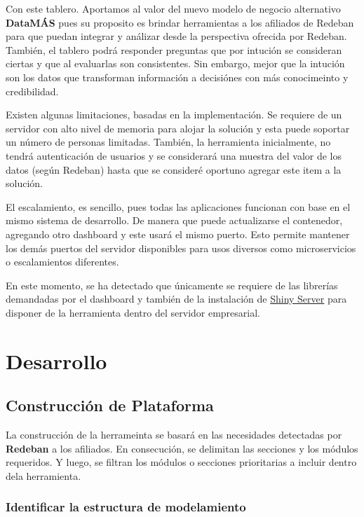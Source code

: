 \documentclass[a4paper]{article}
\begin{document}
Con este tablero. Aportamos al valor del nuevo modelo de negocio alternativo \textbf{DataMÁS} pues su proposito es brindar herramientas a los afiliados de Redeban para que puedan integrar y análizar desde la perspectiva ofrecida por Redeban. También, el tablero podrá responder preguntas que por intución se consideran ciertas y que al evaluarlas son consistentes. Sin embargo, mejor que la intución son los datos que transforman información a decisiónes con más conocimeinto y credibilidad.

Existen algunas limitaciones, basadas en la implementación. Se requiere de un servidor con alto nivel de memoria para alojar la solución y esta puede soportar un número de personas limitadas. También, la herramienta inicialmente, no tendrá autenticación de usuarios y se considerará una muestra del valor de los datos (según Redeban) hasta que se consideré oportuno agregar este item a la solución.

El escalamiento, es sencillo, pues todas las aplicaciones funcionan con base en el mismo sistema de desarrollo. De manera que puede actualizarse el contenedor, agregando otro dashboard y este usará el mismo puerto. Esto permite mantener los demás puertos del servidor disponibles para usos diversos como microservicios o escalamientos diferentes.

En este momento, se ha detectado que únicamente se requiere de las librerías demandadas por el dashboard y también de la instalación de \href{https://rstudio.com/products/shiny/shiny-server/}{Shiny Server} para disponer de la herramienta dentro del servidor empresarial.

\section{Desarrollo}
\subsection{Construcción de Plataforma}

La construcción de la herrameinta se basará en las necesidades detectadas por \textbf{Redeban} a los afiliados. En consecución, se delimitan las secciones y los módulos requeridos. Y luego, se filtran los módulos o secciones prioritarias a incluir dentro dela herramienta.

\subsubsection{Identificar la estructura de modelamiento}
\end{document}
